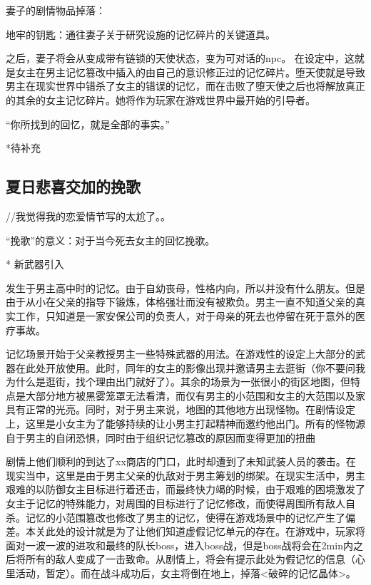 \documentclass[12pt, a4paper]{article}
\begin{document}
            妻子的剧情物品掉落：

                \quad 地牢的钥匙：通往妻子关于研究设施的记忆碎片的关键道具。

            之后，妻子将会从变成带有链锁的天使状态，变为可对话的npc。 在设定中，这就是女主在男主记忆篡改中插入的由自己的意识修正过的记忆碎片。堕天使就是导致男主在现实世界中错杀了女主的错误的记忆，而在击败了堕天使之后也将解放真正的其余的女主记忆碎片。她将作为玩家在游戏世界中最开始的引导者。

            “你所找到的回忆，就是全部的事实。”
            
            *待补充

    \subsection*{夏日悲喜交加的挽歌}

            //我觉得我的恋爱情节写的太尬了。。 


            “挽歌”的意义：对于当今死去女主的回忆挽歌。

            * 新武器引入

            发生于男主高中时的记忆。由于自幼丧母，性格内向，所以并没有什么朋友。但是由于从小在父亲的指导下锻炼，体格强壮而没有被欺负。男主一直不知道父亲的真实工作，只知道是一家安保公司的负责人，对于母亲的死去也停留在死于意外的医疗事故。

            记忆场景开始于父亲教授男主一些特殊武器的用法。在游戏性的设定上大部分的武器在此处开放使用。此时，同年的女主的影像出现并邀请男主去逛街（你不要问我为什么是逛街，找个理由出门就好了）。其余的场景为一张很小的街区地图，但特点是大部分地方被黑雾笼罩无法看清，而仅有男主的小范围和女主的大范围以及家具有正常的光亮。同时，对于男主来说，地图的其他地方出现怪物。在剧情设定上，这里是小女主为了能够持续的让小男主打起精神而邀约他出门。所有的怪物源自于男主的自闭恐惧，同时由于组织记忆篡改的原因而变得更加的扭曲

            剧情上他们顺利的到达了xx商店的门口，此时却遭到了未知武装人员的袭击。在现实当中，这里是由于男主父亲的仇敌对于男主筹划的绑架。在现实生活中，男主艰难的以防御女主目标进行着还击，而最终快力竭的时候，由于艰难的困境激发了女主于记忆的特殊能力，对周围的目标进行了记忆修改，而使得周围所有敌人自杀。记忆的小范围篡改也修改了男主的记忆，使得在游戏场景中的记忆产生了偏差。本关此处的设计就是为了让他们知道虚假记忆单元的存在。在游戏中，玩家将面对一波一波的进攻和最终的队长boss，进入boss战，但是boss战将会在2min内之后将所有的敌人变成了一击致命。从剧情上，将会有提示此处为假记忆的信息（心里活动，暂定）。而在战斗成功后，女主将倒在地上，掉落<破碎的记忆晶体>。
            
\end{document}
